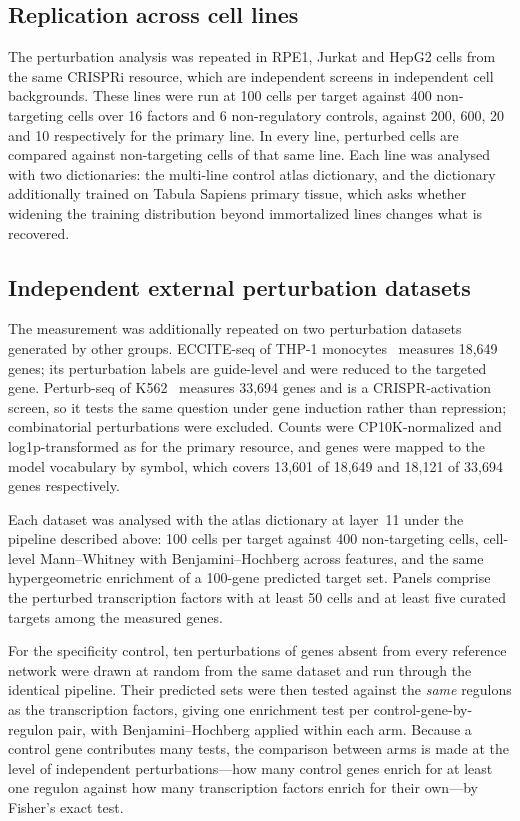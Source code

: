 \subsection*{Replication across cell lines}

The perturbation analysis was repeated in RPE1, Jurkat and HepG2 cells from the same CRISPRi
resource, which are independent screens in independent cell backgrounds. These lines were run at
100 cells per target against 400 non-targeting cells over 16 factors and 6 non-regulatory controls,
against 200, 600, 20 and 10 respectively for the primary line. In
every line, perturbed cells are compared against non-targeting cells of that same line. Each line
was analysed with two dictionaries: the multi-line control atlas dictionary, and the dictionary
additionally trained on Tabula Sapiens primary tissue, which asks whether widening the training
distribution beyond immortalized lines changes what is recovered.

\subsection*{Independent external perturbation datasets}

The measurement was additionally repeated on two perturbation datasets generated by other groups.
ECCITE-seq of THP-1 monocytes~\cite{papalexi2021eccite} measures 18,649 genes; its perturbation
labels are guide-level and were reduced to the targeted gene. Perturb-seq of
K562~\cite{norman2019exploring} measures 33,694 genes and is a CRISPR-activation screen, so it
tests the same question under gene induction rather than repression; combinatorial perturbations
were excluded. Counts were CP10K-normalized and log1p-transformed as for the primary resource, and
genes were mapped to the model vocabulary by symbol, which covers 13,601 of 18,649 and 18,121 of
33,694 genes respectively.

Each dataset was analysed with the atlas dictionary at layer~11 under the pipeline described above:
100 cells per target against 400 non-targeting cells, cell-level Mann--Whitney with
Benjamini--Hochberg across features, and the same hypergeometric enrichment of a 100-gene predicted
target set. Panels comprise the perturbed transcription factors with at least 50 cells and at least
five curated targets among the measured genes.

For the specificity control, ten perturbations of genes absent from every reference network were
drawn at random from the same dataset and run through the identical pipeline. Their predicted sets
were then tested against the \emph{same} regulons as the transcription factors, giving one
enrichment test per control-gene-by-regulon pair, with Benjamini--Hochberg applied within each arm.
Because a control gene contributes many tests, the comparison between arms is made at the level of
independent perturbations---how many control genes enrich for at least one regulon against how many
transcription factors enrich for their own---by Fisher's exact test.

